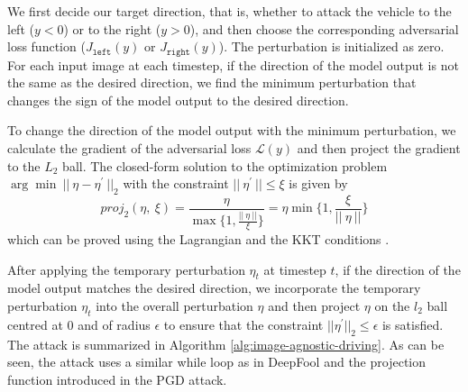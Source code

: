 We first decide our target direction, that is, whether to attack the vehicle to the left ($y < 0$) or to the right ($y > 0$), and then choose the corresponding adversarial loss function ($J_{\texttt{left}}(y)$ or $J_{\texttt{right}}(y)$). The perturbation is initialized as zero. For each input image at each timestep, if the direction of the model output is not the same as the desired direction, we find the minimum perturbation that changes the sign of the model output to the desired direction. 

To change the direction of the model output with the minimum perturbation, we calculate the gradient of the adversarial loss $\mathcal{L}(y)$ and then project the gradient to the $L_2$ ball. The closed-form solution to the optimization problem $\arg \min \ ||\ \eta - \eta^{'} \ ||_{2}$ with the constraint $||\ \eta^{'} \ || \leq \xi$ is given by
\begin{equation}
    proj_{2}(\eta,\  \xi) = \frac{\eta}{\max\{1, \frac{||\ \eta\ ||}{\xi}\}} =  \eta \min\{1, \frac{\xi}{||\ \eta\ ||} \}
\end{equation}
which can be proved using the Lagrangian and the KKT conditions \citep{boyd2004convex}.



After applying the temporary perturbation $\eta_{t}$ at timestep $t$, if the direction of the model output matches the desired direction, we incorporate the temporary perturbation $\eta_{t}$ into the overall perturbation $\eta$ and then project $\eta$ on the $l_2$ ball centred at 0 and of radius $\epsilon$ to ensure that the constraint $||{\eta}^{'}||_{2} \leq \epsilon$ is satisfied. The attack is summarized in Algorithm \ref{alg:image-agnostic-driving}. As can be seen, the attack uses a similar while loop as in DeepFool and the projection function introduced in the PGD attack.


